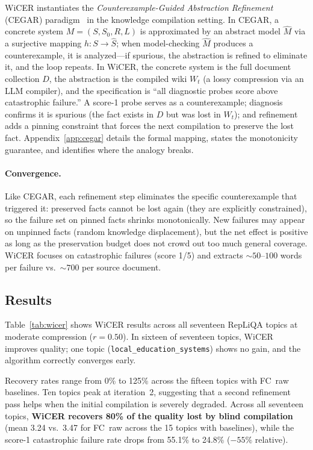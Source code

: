\documentclass{article}
\begin{document}
WiCER instantiates the \emph{Counterexample-Guided Abstraction
Refinement} (CEGAR) paradigm~\cite{clarke2000cegar} in the knowledge
compilation setting. In CEGAR, a concrete system $M = (S, S_0, R, L)$
is approximated by an abstract model $\hat{M}$ via a surjective mapping
$h : S \to \hat{S}$; when model-checking $\hat{M}$ produces a
counterexample, it is analyzed---if spurious, the abstraction is refined
to eliminate it, and the loop repeats. In WiCER, the concrete system is
the full document collection $D$, the abstraction is the compiled wiki
$W_t$ (a lossy compression via an LLM compiler), and the specification
is ``all diagnostic probes score above catastrophic failure.'' A score-1
probe serves as a counterexample; diagnosis confirms it is spurious (the
fact exists in $D$ but was lost in $W_t$); and refinement adds a pinning
constraint that forces the next compilation to preserve the lost fact.
Appendix~\ref{app:cegar} details the formal mapping, states the
monotonicity guarantee, and identifies where the analogy breaks.

\paragraph{Convergence.}
Like CEGAR, each refinement step eliminates the specific counterexample
that triggered it: preserved facts cannot be lost again (they are
explicitly constrained), so the failure set on pinned facts shrinks
monotonically. New failures may appear on unpinned facts (random
knowledge displacement), but the net effect is positive as long as the
preservation budget does not crowd out too much general coverage.
WiCER focuses on catastrophic failures (score 1/5) and extracts
${\sim}50$--$100$ words per failure vs.\ ${\sim}700$ per source document.

\subsection{Results}
Table~\ref{tab:wicer} shows WiCER results across all seventeen RepLiQA topics
at moderate compression ($r = 0.50$). In sixteen of seventeen topics, WiCER
improves quality; one topic (\texttt{local\_education\_systems}) shows no
gain, and the algorithm correctly converges early.

Recovery rates range from 0\% to 125\% across the fifteen topics with
FC~raw baselines. Ten topics peak at iteration~2, suggesting that a second
refinement pass helps when the initial compilation is severely degraded.
Across all seventeen topics,
\textbf{WiCER recovers 80\% of the quality lost by blind compilation}
(mean 3.24 vs.\ 3.47 for FC~raw across the 15 topics with baselines),
while the score-1 catastrophic failure rate drops from 55.1\% to 24.8\%
($-55\%$ relative).
\end{document}
